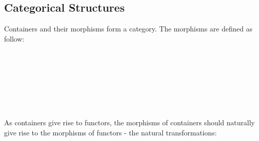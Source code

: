 \subsection{Categorical Structures}

Containers and their morphisms form a category. The morphisms are defined as follow:

\begin{code}%
\>[0]\AgdaSpace{}%
\AgdaSpace{}%
\AgdaSymbol{(}\AgdaSpace{}%
\AgdaSpace{}%
\AgdaSymbol{:}\AgdaSpace{}%
\AgdaSymbol{)}\AgdaSpace{}%
\AgdaSymbol{:}\AgdaSpace{}%
\AgdaSpace{}%
\<%
\\
\>[0][@{}l@{\AgdaIndent{0}}]%
\>[2]\AgdaSpace{}%
\<%
\\
%
\>[2]\AgdaSpace{}%
\AgdaSpace{}%
\<%
\\
%
\>[2]\AgdaSpace{}%
\AgdaSpace{}%
\AgdaSpace{}%
\AgdaSpace{}%
\AgdaSymbol{(}\AgdaSpace{}%
\AgdaSpace{}%
\AgdaSymbol{;}\AgdaSpace{}%
\AgdaSpace{}%
\AgdaSpace{}%
\AgdaSymbol{)}\<%
\\
%
\>[2]\<%
\\
\>[2][@{}l@{\AgdaIndent{0}}]%
\>[4]\AgdaSpace{}%
\AgdaSymbol{:}\AgdaSpace{}%
\AgdaSpace{}%
\AgdaSpace{}%
\<%
\\
%
\>[4]\AgdaSpace{}%
\AgdaSymbol{:}\AgdaSpace{}%
\AgdaSymbol{(}\AgdaSpace{}%
\AgdaSymbol{:}\AgdaSpace{}%
\AgdaSymbol{)}\AgdaSpace{}%
\AgdaSpace{}%
\AgdaSpace{}%
\AgdaSymbol{(}\AgdaSpace{}%
\AgdaSymbol{)}\AgdaSpace{}%
\AgdaSpace{}%
\AgdaSpace{}%
\<%
\end{code}

As containers give rise to functors, the morphisms of containers should naturally give rise to the morphisms of functors - the natural transformations:

